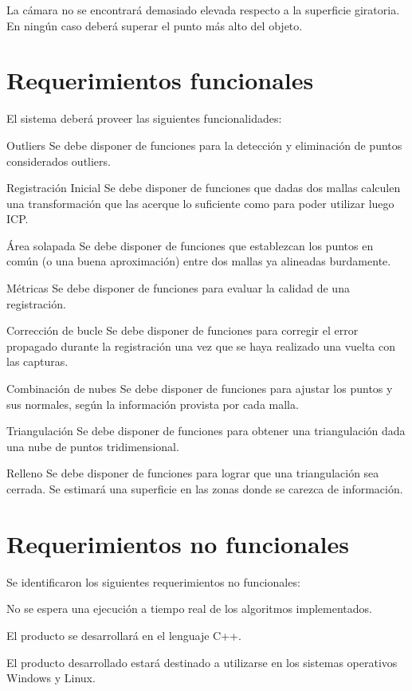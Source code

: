 			La cámara no se encontrará demasiado elevada respecto a la
			superficie giratoria. En ningún caso deberá superar el punto más alto del objeto. %
			\clearpage

	\section{Requerimientos funcionales}
		El sistema deberá proveer las siguientes funcionalidades:

		\Requerimiento
			{Outliers}
			{Se debe disponer de funciones para la detección y eliminación de
			puntos considerados outliers.}

		\Requerimiento
			{Registración Inicial}
			{Se debe disponer de funciones que dadas dos mallas calculen una
			transformación que las acerque lo suficiente como para poder
			utilizar luego ICP.}

		\Requerimiento
			{Área solapada}
			{Se debe disponer de funciones que establezcan los puntos en común (o una buena
			aproximación) entre dos mallas ya alineadas burdamente.}

		\Requerimiento
			{Métricas}
			{Se debe disponer de funciones para evaluar la calidad de una registración.}

		\Requerimiento
			{Corrección de bucle}
			{Se debe disponer de funciones para corregir el error propagado durante la registración
			una vez que se haya realizado una vuelta con las capturas.}

		\Requerimiento
			{Combinación de nubes}
			{Se debe disponer de funciones para ajustar los puntos y sus normales,
			según la información provista por cada malla.}

		\Requerimiento
			{Triangulación}
			{Se debe disponer de funciones para obtener una triangulación dada una nube de puntos tridimensional.}

		\Requerimiento
			{Relleno}
			{Se debe disponer de funciones para lograr que una triangulación sea cerrada. Se
			estimará una superficie en las zonas donde se carezca de
			información.}

	\section{Requerimientos no funcionales}
		Se identificaron los siguientes requerimientos no funcionales:
	
		{No se espera una ejecución a tiempo real de los algoritmos implementados.}

		{El producto se desarrollará en el lenguaje C++.}

		{El producto desarrollado estará destinado a utilizarse en los sistemas
		operativos Windows y Linux.}
